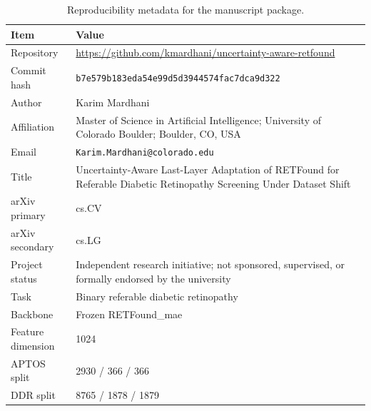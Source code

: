 \begin{table}[t]
\centering
\footnotesize
\caption{Reproducibility metadata for the manuscript package.}
\label{tab:reproducibility}
\begin{tabularx}{\textwidth}{p{}X}
\toprule
Item & Value \\
\midrule
Repository & \url{https://github.com/kmardhani/uncertainty-aware-retfound} \\
Commit hash & \nolinkurl{b7e579b183eda54e99d5d3944574fac7dca9d322} \\
Author & Karim Mardhani \\
Affiliation & Master of Science in Artificial Intelligence; University of Colorado Boulder; Boulder, CO, USA \\
Email & \nolinkurl{Karim.Mardhani@colorado.edu} \\
Title & Uncertainty-Aware Last-Layer Adaptation of RETFound for Referable Diabetic Retinopathy Screening Under Dataset Shift \\
arXiv primary & cs.CV \\
arXiv secondary & cs.LG \\
Project status & Independent research initiative; not sponsored, supervised, or formally endorsed by the university \\
Task & Binary referable diabetic retinopathy \\
Backbone & Frozen RETFound\_mae \\
Feature dimension & 1024 \\
APTOS split & 2930 / 366 / 366 \\
DDR split & 8765 / 1878 / 1879 \\
\bottomrule
\end{tabularx}
\end{table}
